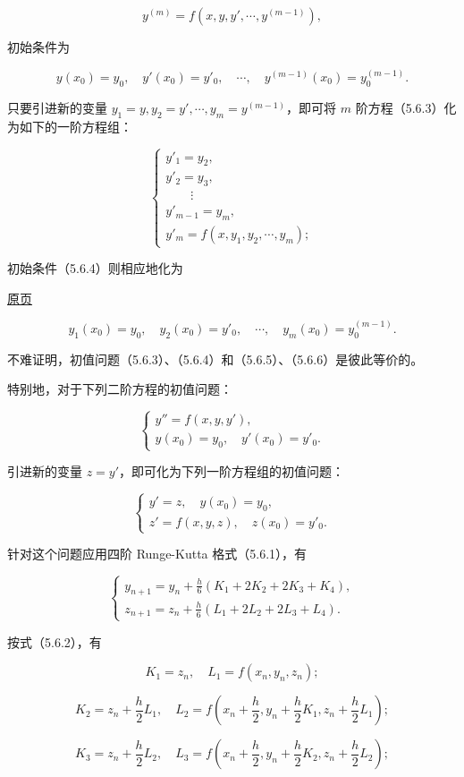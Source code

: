 \documentclass[
  10pt,
  fontset=fandol]{ctexart}
\begin{document}
\[
y^{(m)}=f(x,y,y',\cdots,y^{(m-1)}),
\tag{5.6.3}
\]

初始条件为

\[
y(x_0)=y_0,\quad y'(x_0)=y'_0,\quad\cdots,\quad y^{(m-1)}(x_0)=y_0^{(m-1)}.
\tag{5.6.4}
\]

只要引进新的变量 \(y_1=y,y_2=y',\cdots,y_m=y^{(m-1)}\)，即可将 \(m\) 阶方程（5.6.3）化为如下的一阶方程组：

\[
\begin{cases}
y'_1=y_2,\\
y'_2=y_3,\\
\qquad\vdots\\
y'_{m-1}=y_m,\\
y'_m=f(x,y_1,y_2,\cdots,y_m);
\end{cases}
\tag{5.6.5}
\]

初始条件（5.6.4）则相应地化为

\href{../../source-images/pdf-147.jpeg}{原页}

\[
y_1(x_0)=y_0,\quad y_2(x_0)=y'_0,\quad\cdots,\quad y_m(x_0)=y_0^{(m-1)}.
\tag{5.6.6}
\]

不难证明，初值问题（5.6.3）、（5.6.4）和（5.6.5）、（5.6.6）是彼此等价的。

特别地，对于下列二阶方程的初值问题：

\[
\begin{cases}
y''=f(x,y,y'),\\
y(x_0)=y_0,\quad y'(x_0)=y'_0.
\end{cases}
\]

引进新的变量 \(z=y'\)，即可化为下列一阶方程组的初值问题：

\[
\begin{cases}
y'=z,\quad y(x_0)=y_0,\\
z'=f(x,y,z),\quad z(x_0)=y'_0.
\end{cases}
\]

针对这个问题应用四阶 Runge-Kutta 格式（5.6.1），有

\[
\begin{cases}
\displaystyle y_{n+1}=y_n+\frac h6(K_1+2K_2+2K_3+K_4),\\[6pt]
\displaystyle z_{n+1}=z_n+\frac h6(L_1+2L_2+2L_3+L_4).
\end{cases}
\]

按式（5.6.2），有

\[
K_1=z_n,\quad L_1=f(x_n,y_n,z_n);
\]

\[
K_2=z_n+\frac h2L_1,\quad
L_2=f\left(x_n+\frac h2,y_n+\frac h2K_1,z_n+\frac h2L_1\right);
\]

\[
K_3=z_n+\frac h2L_2,\quad
L_3=f\left(x_n+\frac h2,y_n+\frac h2K_2,z_n+\frac h2L_2\right);
\]
\end{document}
